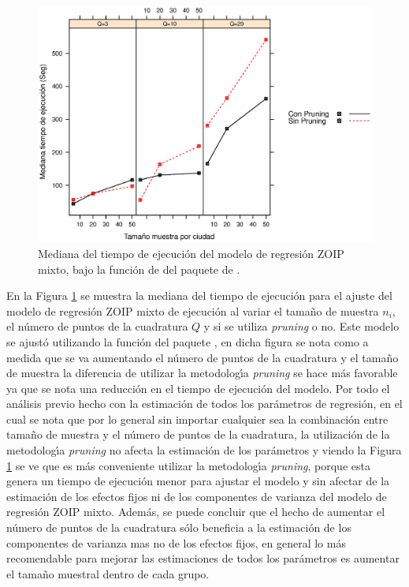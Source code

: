 \begin{figure}
	\begin{center}
		\includegraphics[scale=0.6]{time_mix_ZOIP.eps}	
		\caption{Mediana del tiempo de ejecuci\'{o}n del modelo de regresi\'{o}n ZOIP mixto, bajo la funci\'{o}n de  del paquete  de .}
		\label{time_mix_ZOIP}
	\end{center}
\end{figure}

En la Figura \ref{time_mix_ZOIP} se muestra la mediana del tiempo de ejecuci\'{o}n para el ajuste del modelo de regresi\'{o}n ZOIP mixto de ejecuci\'{o}n al variar el tama\~{n}o de muestra $n_i$, el n\'{u}mero de puntos de la cuadratura $Q$ y si se utiliza \textit{pruning} o no. Este modelo se ajust\'{o} utilizando la funci\'{o}n  del paquete , en dicha figura se nota como a medida que se va aumentando el n\'{u}mero de puntos de la cuadratura y el tama\~{n}o de muestra la diferencia de utilizar la metodolog\'{\i}a \textit{pruning} se hace m\'{a}s favorable ya que se nota una reducci\'{o}n en el tiempo de ejecuci\'{o}n del modelo. Por todo el an\'{a}lisis previo hecho con la estimaci\'{o}n de todos los par\'{a}metros de regresi\'{o}n, en el cual se nota que por lo general sin importar cualquier sea la combinaci\'{o}n entre tama\~{n}o de muestra y el n\'{u}mero de puntos de la cuadratura, la utilizaci\'{o}n de la metodolog\'{\i}a \textit{pruning} no afecta la estimaci\'{o}n de los par\'{a}metros y viendo la Figura \ref{time_mix_ZOIP} se ve que es m\'{a}s conveniente utilizar la metodolog\'{\i}a \textit{pruning}, porque esta genera un tiempo de ejecuci\'{o}n menor para ajustar el modelo y sin afectar de la estimaci\'{o}n de los efectos fijos ni de los componentes de varianza del modelo de regresi\'{o}n ZOIP mixto. Adem\'{a}s, se puede concluir que el hecho de aumentar el n\'{u}mero de puntos de la cuadratura s\'{o}lo beneficia a la estimaci\'{o}n de los componentes de varianza mas no de los efectos fijos, en general lo m\'{a}s recomendable para mejorar las estimaciones de todos los par\'{a}metros es aumentar el tama\~{n}o muestral dentro de cada grupo.


